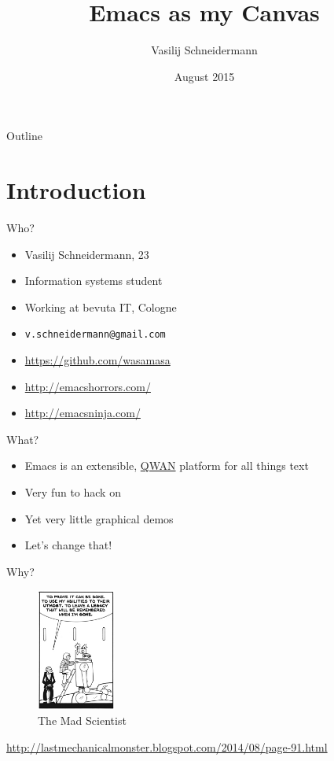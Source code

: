 \documentclass[presentation]{beamer}
\author{Vasilij Schneidermann}
\date{August 2015}
\title{Emacs as my Canvas}
\begin{document}
\maketitle
\begin{frame}{Outline}
\tableofcontents
\end{frame}

\AtBeginSection{\frame{\sectionpage}}

\section{Introduction}
\label{sec-1}

\begin{frame}[label=sec-1-1]{Who?}
\begin{itemize}
\item Vasilij Schneidermann, 23
\item Information systems student
\item Working at bevuta IT, Cologne
\item \texttt{v.schneidermann@gmail.com}
\item \url{https://github.com/wasamasa}
\item \url{http://emacshorrors.com/}
\item \url{http://emacsninja.com/}
\end{itemize}
\end{frame}

\begin{frame}[label=sec-1-2]{What?}
\begin{itemize}
\item Emacs is an extensible, \href{http://steve-yegge.blogspot.de/2007/01/pinocchio-problem.html}{QWAN} platform for all things text
\item Very fun to hack on
\item Yet very little graphical demos
\item Let's change that!
\end{itemize}
\end{frame}

\begin{frame}[label=sec-1-3]{Why?}
\begin{figure}[htb]
\centering
\includegraphics[height=4cm]{./images/why.jpg}
\caption{The Mad Scientist}
\end{figure}

\url{http://lastmechanicalmonster.blogspot.com/2014/08/page-91.html}
\end{frame}
\end{document}
